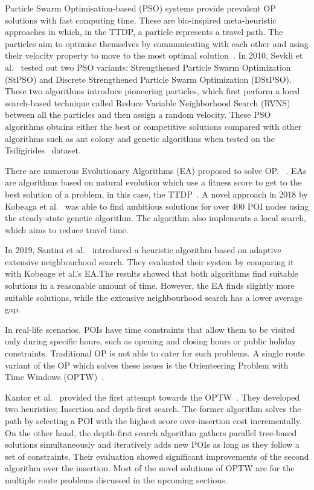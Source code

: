 Particle Swarm Optimisation-based (PSO) systems provide prevalent OP solutions
with fast computing time. These are bio-inspired meta-heuristic approaches in
which, in the TTDP, a particle represents a travel path. The particles aim to
optimise themselves by communicating with each other and using their velocity
property to move to the most optimal solution~\cite{RezaeeJordehi2013}. In 2010, Sevkli
et al.~\cite{Sevkli2010,Sevkli2010a} tested out two PSO variants:
Strengthened Particle Swarm Optimization (StPSO) and Discrete Strengthened
Particle Swarm Optimization (DStPSO). These two algorithms introduce pioneering
particles, which first perform a local search-based technique called Reduce
Variable Neighborhood Search (RVNS) between all the particles and then assign a
random velocity. These PSO algorithms obtains either the best or competitive
solutions compared with other algorithms such as ant colony and genetic
algorithms when tested on the Tsiligirides~\cite{Tsiligirides1984, Chen2011a} dataset.


There are numerous Evolutionary Algorithms (EA) proposed to solve OP.\@
~\cite{Kobeaga2018,Wang2008}. EAs are algorithms based on natural evolution which
use a fitness score to get to the best solution of a problem, in this case, the
TTDP~\cite{Gunawan2016}. A novel approach in 2018  by Kobeaga et al.~\cite{Kobeaga2018} was able
to find ambitious solutions for over 400 POI nodes using the steady-state
genetic algorithm. The algorithm also implements a local
search, which aims to reduce travel time. 

In 2019, Santini et al.~\cite{Santini2019} introduced a heuristic algorithm based on
adaptive extensive neighbourhood search. They evaluated their system by
comparing it with Kobeage et al.'s EA.\@ The results showed that both algorithms
find suitable solutions in a reasonable amount of time. However, the EA finds
slightly more suitable solutions, while the extensive neighbourhood search has
a lower average gap.

In real-life scenarios, POIs have time constraints that allow them to be
visited only during specific hours, such as opening and closing hours or public
holiday constraints. Traditional OP is not able to cater for such problems. A
single route variant of the OP which solves these issues is the Orienteering
Problem with Time Windows (OPTW)~\cite{Gavalas2014a}. 

Kantor et al.~\cite{Kantor1992} provided the first attempt towards the
OPTW~\cite{Vansteenwegen2011}. They developed two heuristics;
Insertion and depth-first search. The former algorithm solves the path by
selecting a POI with the highest score over-insertion cost incrementally. On
the other hand, the depth-first search algorithm gathers parallel tree-based
solutions simultaneously and iteratively adds new POIs as long as they follow a
set of constraints. Their evaluation showed significant improvements of the
second algorithm over the insertion. Most of the novel solutions of OPTW are
for the multiple route problems discussed in the upcoming sections. 

